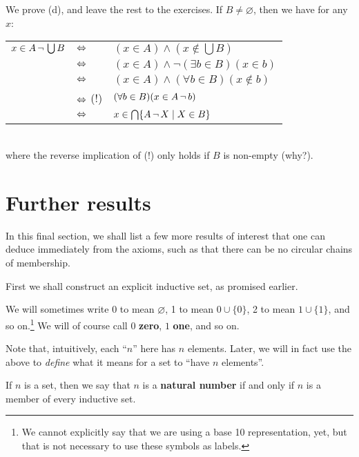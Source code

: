 \begin{prf}
\label{Thm:_Algebra_of_Sets_part_five}
We prove (d), and leave the rest to the exercises. If $B\neq \varnothing$, then we have for any $x$: \\

\begin{tabular}{lll}
 $x\in A\, \lnot \, \bigcup B$ & $\Leftrightarrow$ & $(x\in A)\land (x\notin \bigcup B)$ \\ 
  & $\Leftrightarrow$ & $(x\in A)\land\lnot(\exists b\in B)(x\in b)$ \\ 
  & $\Leftrightarrow$ & $(x\in A)\land(\forall b\in B)(x\notin b)$ \\
  & $\Leftrightarrow$ (!) & $(\forall b\in B)(x\in A\, \lnot \, b)$ \\
  & $\Leftrightarrow$ &  $x\in \bigcap\{A\, \lnot \, X\mid X\in B\}$ \\
\end{tabular} \\

where the reverse implication of (!) only holds if $B$ is non-empty (why?). 
\end{prf}

\section{Further results}
\label{--Sec:_Further_Results}

In this final section, we shall list a few more results of interest that  one can deduce immediately from the axioms, such as that there can be no circular chains of membership. 

First we shall construct an explicit inductive set, as promised earlier. 

\begin{defn}
\label{Defn:_0_1_2_etc}
We will sometimes write $0$ to mean $\varnothing$, 1 to mean $0\cup\{0\}$, 2 to mean $1\cup\{1\}$, and so on.\footnote{We cannot explicitly say that we are using a base 10 representation, yet, but that is not necessary to use these symbols as labels.} We will of course call $0$ \textbf{zero}, $1$ \textbf{one}, and so on. 
\end{defn}

Note that, intuitively, each \enquote{$n$} here has $n$ elements. Later, we will in fact use the above to \emph{define} what it means for a set to \enquote{have $n$ elements}.

\begin{defn}
\label{Defn:_Natural_Number} 
If $n$ is a set, then we say that $n$ is a \textbf{natural number} if and only if $n$ is a member of every inductive set. 
\end{defn}

